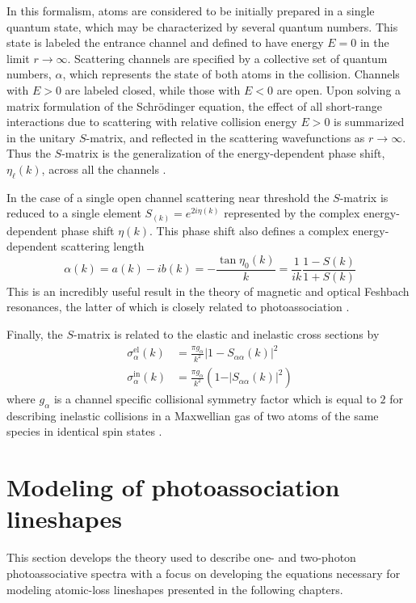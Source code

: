 In this formalism, atoms are considered to be initially prepared in a single quantum state, which may be characterized by several quantum numbers.
This state is labeled the entrance channel and defined to have energy $E=0$ in the limit $r\rightarrow\infty$.
Scattering channels are specified by a collective set of quantum numbers, $\alpha$, which represents the state of both atoms in the collision.
Channels with $E>0$ are labeled closed, while those with $E<0$ are open.
Upon solving a matrix formulation of the Schr\"{o}dinger equation, the effect of all short-range interactions due to scattering with relative collision energy $E > 0$ is summarized in the unitary $S$-matrix, and reflected in the scattering wavefunctions as $r\rightarrow\infty$. 
Thus the $S$-matrix is the generalization of the energy-dependent phase shift, $\eta_{\ell}(k)$, across all the channels \cite{Julienne2009a}.

In the case of a single open channel scattering near threshold the $S$-matrix is reduced to a single element $S_(k)=e^{2i\eta(k)}$ represented by the complex energy-dependent phase shift $\eta(k)$.
This phase shift also defines a complex energy-dependent scattering length
\begin{equation}
	\alpha(k) = a(k) - i b(k) = -\frac{\tan \eta_0(k)}{k} = \frac{1}{ik} \frac{1-S(k)}{1+S(k)}
\end{equation}
This is an incredibly useful result in the theory of magnetic and optical Feshbach resonances, the latter of which is closely related to photoassociation \cite{Chin2010,Nicholson2015a}.

Finally, the $S$-matrix is related to the elastic and inelastic cross sections by \cite{Pachomov2017}
\begingroup
\addtolength{\jot}{1em}
\begin{align}
	\sigma^{\text{el}}_{\alpha}(k) &= \frac{\pi g_{\alpha}}{k^2} \vert 1 - S_{\alpha \alpha}(k) \vert^2 \\
	\label{eq:sigin}	
	\sigma^{\text{in}}_{\alpha}(k) &= \frac{\pi g_{\alpha}}{k^2} \left( 1 - \vert S_{\alpha \alpha}(k) \vert^2 \right)
\end{align}	
\endgroup
where $g_{\alpha}$ is a channel specific collisional symmetry factor which is equal to $2$ for describing inelastic collisions in a Maxwellian gas of two atoms of the same species in identical spin states \cite{Chin2010}.


\section{Modeling of photoassociation lineshapes} \label{sec:bohn_and_julienne}
This section develops the theory used to describe one- and two-photon photoassociative spectra with a focus on developing the equations necessary for modeling atomic-loss lineshapes presented in the following chapters.

